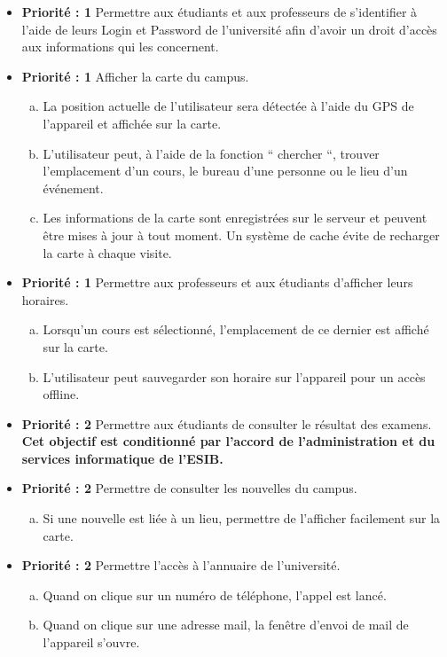 \begin{itemize}
	\item \textbf{Priorité : 1}  Permettre aux étudiants et aux professeurs de s'identifier à l'aide de leurs Login et Password de l'université afin d'avoir un droit d'accès aux informations qui les concernent.
	\item \textbf{Priorité : 1} Afficher la carte du campus.
	\begin{enumerate}[a)]
		\item La position actuelle de l'utilisateur sera détectée à l'aide du \gls{GPS} de l'appareil et affichée sur la carte.
		\item L'utilisateur peut, à l'aide de la fonction `` chercher ``, trouver l'emplacement d'un cours, le bureau d'une personne ou le lieu d'un événement.
		\item Les informations de la carte sont enregistrées sur le serveur et peuvent être mises à jour à tout moment. Un système de cache évite de recharger la carte à chaque visite.
	\end{enumerate}
	\item \textbf{Priorité : 1} Permettre aux professeurs et aux étudiants d'afficher leurs horaires.
	\begin{enumerate}[a)]
		\item Lorsqu'un cours est sélectionné, l'emplacement de ce dernier est affiché sur la carte.
		\item L'utilisateur peut sauvegarder son horaire sur l'appareil pour un accès offline.
	\end{enumerate}
	\item \textbf{Priorité : 2} Permettre aux étudiants de consulter le résultat des examens. \textbf{Cet objectif est conditionné par l'accord de l'administration et du services informatique de l'\gls{ESIB}.}
	\item \textbf{Priorité : 2} Permettre de consulter les nouvelles du campus.
		\begin{enumerate}[a)]
			\item Si une nouvelle est liée à un lieu, permettre de l'afficher facilement sur la carte.
		\end{enumerate}
	\item \textbf{Priorité : 2} Permettre l'accès à l'annuaire de l'université. 
		\begin{enumerate}[a)]
			\item Quand on clique sur un numéro de téléphone, l'appel est lancé.
			\item Quand on clique sur une adresse mail, la fenêtre d'envoi de mail de l'appareil s'ouvre.
		\end{enumerate}
\end{itemize}

